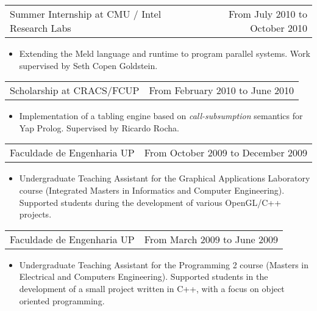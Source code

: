 \documentclass[margin]{res}
\begin{document}
\begin{resume}
                  \begin{tabular}{p{3in} r}
                    Summer Internship at CMU / Intel Research Labs & From July 2010 to October 2010
                  \end{tabular}
                  \begin{itemize}
                    \item[] Extending the Meld language and runtime to program parallel systems. Work supervised by Seth Copen Goldstein.
                  \end{itemize}
                  \clearpage
                  
                  \begin{tabular}{p{3in} r}
                    Scholarship at CRACS/FCUP & From February 2010 to June 2010
                  \end{tabular}
                  \begin{itemize}
                    \item[] Implementation of a tabling engine based on \textit{call-subsumption} semantics for Yap Prolog. Supervised by Ricardo Rocha.
                  \end{itemize}
                  

                  \begin{tabular}{p{3in} r} %
                    Faculdade de Engenharia UP &  From October 2009 to December 2009
                   \end{tabular}
                    \begin{itemize}					        
                     \item[] Undergraduate Teaching Assistant for the Graphical Applications Laboratory course (Integrated Masters in Informatics and Computer Engineering). Supported students during the development of various OpenGL/C++ projects.
                    \end{itemize}
                    
                 \begin{tabular}{p{3in} r} %
                  Faculdade de Engenharia UP &  From March 2009 to June 2009
                 \end{tabular}
                  \begin{itemize}					        
                   \item[] Undergraduate Teaching Assistant for the Programming 2 course (Masters in Electrical and Computers Engineering). Supported students in the development of a small project written in C++, with a focus on object oriented programming.
                  \end{itemize}



\end{resume}
\end{document}
